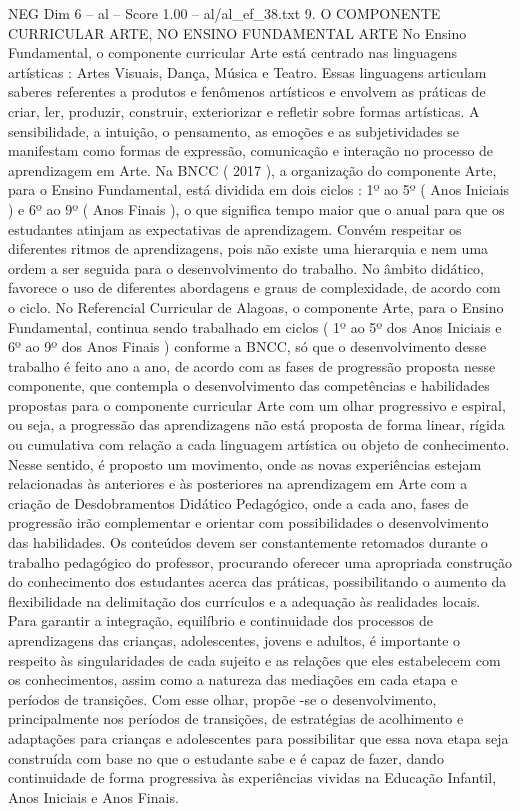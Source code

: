 \begin{textsample}{NEG Dim 6 – al – Score 1.00 – al/al\_ef\_38.txt}  \label{ex:f6_neg_069}
9.
O COMPONENTE CURRICULAR ARTE, NO ENSINO FUNDAMENTAL ARTE No Ensino Fundamental, o componente curricular Arte está centrado nas linguagens artísticas : Artes Visuais, Dança, Música e Teatro.
Essas linguagens articulam saberes referentes a produtos e fenômenos artísticos e envolvem as práticas de criar, ler, produzir, construir, exteriorizar e refletir sobre formas artísticas.
A sensibilidade, a intuição, o pensamento, as emoções e as subjetividades se manifestam como formas de expressão, comunicação e interação no processo de aprendizagem em Arte.
Na BNCC ( 2017 ), a organização do componente Arte, para o Ensino Fundamental, está dividida em dois ciclos : 1º ao 5º ( Anos Iniciais ) e 6º ao 9º ( Anos Finais ), o que significa tempo maior que o anual para que os estudantes atinjam as expectativas de aprendizagem.
Convém respeitar os diferentes ritmos de aprendizagens, pois não existe uma hierarquia e nem uma ordem a ser seguida para o desenvolvimento do trabalho.
No âmbito didático, favorece o uso de diferentes abordagens e graus de complexidade, de acordo com o ciclo.
No Referencial Curricular de Alagoas, o componente Arte, para o Ensino Fundamental, continua sendo trabalhado em ciclos ( 1º ao 5º dos Anos Iniciais e 6º ao 9º dos Anos Finais ) conforme a BNCC, só que o desenvolvimento desse trabalho é feito ano a ano, de acordo com as fases de progressão proposta nesse componente, que contempla o desenvolvimento das competências e habilidades propostas para o componente curricular Arte com um olhar progressivo e espiral, ou seja, a progressão das aprendizagens não está proposta de forma linear, rígida ou cumulativa com relação a cada linguagem artística ou objeto de conhecimento.
Nesse sentido, é proposto um movimento, onde as novas experiências estejam relacionadas às anteriores e às posteriores na aprendizagem em Arte com a criação de Desdobramentos Didático Pedagógico, onde a cada ano, fases de progressão irão complementar e orientar com possibilidades o desenvolvimento das habilidades.
Os conteúdos devem ser constantemente retomados durante o trabalho pedagógico do professor, procurando oferecer uma apropriada construção do conhecimento dos estudantes acerca das práticas, possibilitando o aumento da flexibilidade na delimitação dos currículos e a adequação às realidades locais.
Para garantir a integração, equilíbrio e continuidade dos processos de aprendizagens das crianças, adolescentes, jovens e adultos, é importante o respeito às singularidades de cada sujeito e as relações que eles estabelecem com os conhecimentos, assim como a natureza das mediações em cada etapa e períodos de transições.
Com esse olhar, propõe -se o desenvolvimento, principalmente nos períodos de transições, de estratégias de acolhimento e adaptações para crianças e adolescentes para possibilitar que essa nova etapa seja construída com base no que o estudante sabe e é capaz de fazer, dando continuidade de forma progressiva às experiências vividas na Educação Infantil, Anos Iniciais e Anos Finais.

\end{textsample}
